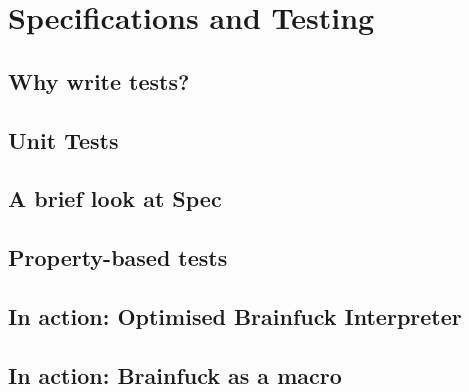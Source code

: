 \chapter{Specifications and Testing}

\section{Why write tests?}

\section{Unit Tests}

\section{A brief look at Spec}

\section{Property-based tests}

\section{In action: Optimised Brainfuck Interpreter}

\section{In action: Brainfuck as a macro}

